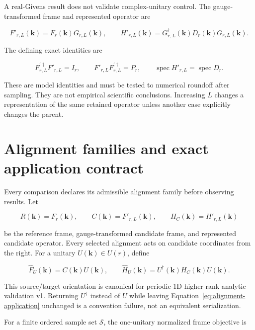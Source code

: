 \documentclass[11pt]{article}
\begin{document}
A real-Givens result does not validate complex-unitary control. The gauge-transformed frame and represented operator are

\[
F'_{r,L}(\mathbf k)=F_r(\mathbf k)G_{r,L}(\mathbf k),
\qquad
H'_{r,L}(\mathbf k)=G_{r,L}^\dagger(\mathbf k)
D_r(\mathbf k)G_{r,L}(\mathbf k).
\]

The defining exact identities are

\[
F_{r,L}^{\prime\dagger}F'_{r,L}=I_r,
\qquad
F'_{r,L}F_{r,L}^{\prime\dagger}=P_r,
\qquad
\operatorname{spec}H'_{r,L}=\operatorname{spec}D_r.
\]

These are model identities and must be tested to numerical roundoff after sampling. They
are not empirical scientific conclusions. Increasing $L$ changes a representation of the
same retained operator unless another case explicitly changes the parent.

\section{Alignment families and exact application contract}

Every comparison declares its admissible alignment family before observing results. Let

\begin{equation}
 R(\mathbf k)=F_r(\mathbf k),
 \qquad
 C(\mathbf k)=F'_{r,L}(\mathbf k),
 \qquad
 H_C(\mathbf k)=H'_{r,L}(\mathbf k)
 \label{eq:alignment-reference-candidate}
\end{equation}

be the reference frame, gauge-transformed candidate frame, and represented candidate operator.
Every selected alignment acts on candidate coordinates from the right. For a unitary
$U(\mathbf k)\in U(r)$, define

\begin{equation}
 \widehat F_U(\mathbf k)=C(\mathbf k)U(\mathbf k),
 \qquad
 \widehat H_U(\mathbf k)=U^\dagger(\mathbf k)
 H_C(\mathbf k)U(\mathbf k).
 \label{eq:alignment-application}
\end{equation}

This source/target orientation is canonical for periodic-1D higher-rank analytic validation v1. Returning $U^\dagger$ instead of
$U$ while leaving Equation~\eqref{eq:alignment-application} unchanged is a convention
failure, not an equivalent serialization.

For a finite ordered sample set $\mathcal S$, the one-unitary normalized frame objective
is
\end{document}
